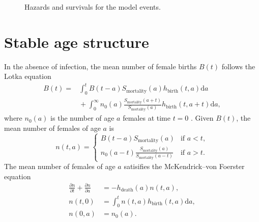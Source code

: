 \documentclass[12pt]{article}
\newcommand{\md}{\mathrm{d}}
\begin{document}
\begin{figure}
  \centering
  
  \caption{Hazards and survivals for the model events.}
  \label{fig:distributions}
\end{figure}


\clearpage
\section{Stable age structure}
\label{no_infection}

In the absence of infection, the mean number of female births $B(t)$
follows the Lotka equation
\begin{equation}
  \label{lotka}
  \begin{split}
    B(t) =&
    \int_0^t B(t - a) S_{\text{mortality}}(a) h_{\text{birth}}(t, a) \md a
    \\
    & {} +
    \int_0^{\infty} n_0(a) \frac{S_{\text{mortality}}(a +
      t)}{S_{\text{mortality}}(a)} h_{\text{birth}}(t, a + t) \md a,
  \end{split}
\end{equation}
where $n_0(a)$ is the number of age $a$ females at time $t = 0$
\citetext{\citealp[Chapter VI, Section 29 on
  pp.~159--161]{harris_1963};
  \citealp[Chapter 20 on pp.~353--364]{kot_01}}.
Given $B(t)$, the mean number of females of age $a$ is
\begin{equation}
  n(t, a) =
  \begin{cases}
    B(t - a) S_{\text{mortality}}(a)
    & \text{if $a < t$},
    \\
    n_0(a - t)
    \frac{S_{\text{mortality}}(a)}{S_{\text{mortality}}(a - t)}
    & \text{if $a > t$}.
  \end{cases}
\end{equation}
The mean number of females of age $a$ satisifies the McKendrick--von
Foerster equation
\begin{equation}
  \begin{split}
    \frac{\partial n}{\partial t} + \frac{\partial n}{\partial a}
    &= - h_{\text{death}}(a) n(t, a),
    \\
    n(t, 0) &= \int_0^t n(t, a) h_{\text{birth}}(t, a) \md a,
    \\
    n(0, a) &= n_0(a).
  \end{split}
\end{equation}
\end{document}

